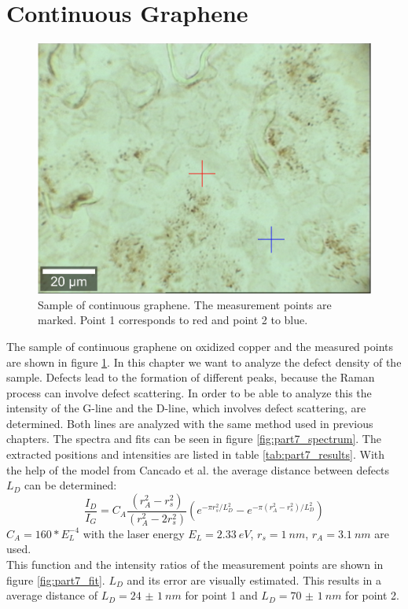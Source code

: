 \documentclass[12pt,a4paper]{article}
\begin{document}
\newpage
\section{Continuous Graphene}
\label{sec:9}

\begin{figure}[!htb]
\centering
\includegraphics[scale=0.3]{Bilder/part7/Continuousoptical.png}
\caption{Sample of continuous graphene. The measurement points are marked. Point 1 corresponds to red and point 2 to blue.}
\label{fig:part7_sample}
\end{figure}

The sample of continuous graphene on oxidized copper and the measured points are shown in figure \ref{fig:part7_sample}. In this chapter we want to analyze the defect density of the sample. Defects lead to the formation of different peaks, because the Raman process can involve defect scattering. In order to be able to analyze this the intensity of the G-line and the D-line, which involves defect scattering, are determined. Both lines are analyzed with the same method used in previous chapters. The spectra and fits can be seen in figure \ref{fig:part7_spectrum}. The extracted positions and intensities are listed in table \ref{tab:part7_results}. With the help of the model from Cancado et al.\cite{cancado} the average distance between defects $L_D$ can be determined:
\begin{equation}
\dfrac{I_D}{I_G} = C_A \dfrac{(r_A^2 - r_s^2)}{(r_A^2 - 2 r_s^2)} \left( e^{-\pi r_s^2/L_D^2} -e^{-\pi (r_A^2 - r_s^2)/L_D^2} \right)
\end{equation}
$C_A = 160 * E_L^{-4}$ with the laser energy $E_L = \SI{2.33}{eV}$, $r_s = \SI{1}{nm}$, $r_A = \SI{3.1}{nm}$ are used.\\
This function and the intensity ratios of the measurement points are shown in figure \ref{fig:part7_fit}. $L_D$ and its error are visually estimated. This results in a average distance of $L_D = \SI{24(1)}{nm}$ for point 1 and $L_D = \SI{70(1)}{nm}$ for point 2.
\end{document}
